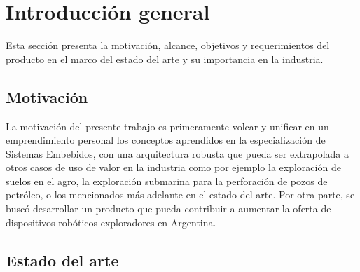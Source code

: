 
\chapter{Introducción general} %

\label{Chapter1} %
\label{IntroGeneral}


\newcommand{\keyword}[1]{\textbf{#1}}
\newcommand{\tabhead}[1]{\textbf{#1}}
\newcommand{\code}[1]{\texttt{#1}}
\newcommand{\file}[1]{\texttt{\bfseries#1}}
\newcommand{\option}[1]{\texttt{\itshape#1}}
\newcommand{\grados}{$^{\circ}$}


Esta sección presenta la motivación, alcance, objetivos y requerimientos del producto en el marco del estado del arte y su importancia en la industria.  

\section{Motivación}

La motivación del presente trabajo es primeramente volcar y unificar en un emprendimiento personal los conceptos aprendidos en la especialización de Sistemas Embebidos, con una arquitectura robusta que pueda ser extrapolada a otros casos de uso de valor en la industria como por ejemplo la exploración de suelos en el agro, la exploración submarina para la perforación de pozos de petróleo, o los mencionados más adelante en el estado del arte.
Por otra parte, se buscó desarrollar un producto que pueda contribuir a aumentar la oferta de dispositivos robóticos exploradores en Argentina.

\section{Estado del arte}

